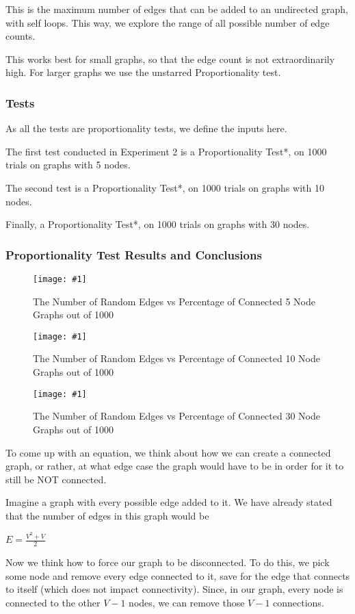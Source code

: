 \documentclass[12pt]{article}
\newcommand{\firgureBuffered}[2]
{
    \begin{figure}[ht!]
        \centering
        \texttt{[image: \#1]}
        \caption{#2}
    \end{figure}
}
\begin{document}
This is the maximum number of edges that can be added to an undirected graph, with self loops. This way, we explore the range of all possible number of edge counts.

This works best for small graphs, so that the edge count is not extraordinarily high. For larger graphs we use the unstarred Proportionality test.


\subsubsection{Tests}

As all the tests are proportionality tests, we define the inputs here.

The first test conducted in Experiment 2 is a Proportionality Test*, on 1000 trials on graphs with 5 nodes.

The second test is a Proportionality Test*, on 1000 trials on graphs with 10 nodes.

Finally, a Proportionality Test*, on 1000 trials on graphs with 30 nodes.

\subsubsection{Proportionality Test Results and Conclusions}

\FloatBarrier{}
\firgureBuffered{images/experiment2/a.png}{The Number of Random Edges vs Percentage of Connected 5 Node Graphs out of 1000}
\firgureBuffered{images/experiment2/b.png}{The Number of Random Edges vs Percentage of Connected 10 Node Graphs out of 1000}
\firgureBuffered{images/experiment2/c.png}{The Number of Random Edges vs Percentage of Connected 30 Node Graphs out of 1000}
\FloatBarrier{}

To come up with an equation, we think about how we can create a connected graph, or rather, at what edge case the graph would have to be in order for it to still be NOT connected.

Imagine a graph with every possible edge added to it. We have already stated that the number of edges in this graph would be
\begin{center}
    $E = \frac{V^2 + V}{2}$
\end{center}

Now we think how to force our graph to be disconnected. To do this, we pick some node and remove every edge connected to it, save for the edge that connects to itself (which does not impact connectivity). Since, in our graph, every node is connected to the other $V-1$ nodes, we can remove those $V-1$ connections.
\end{document}
